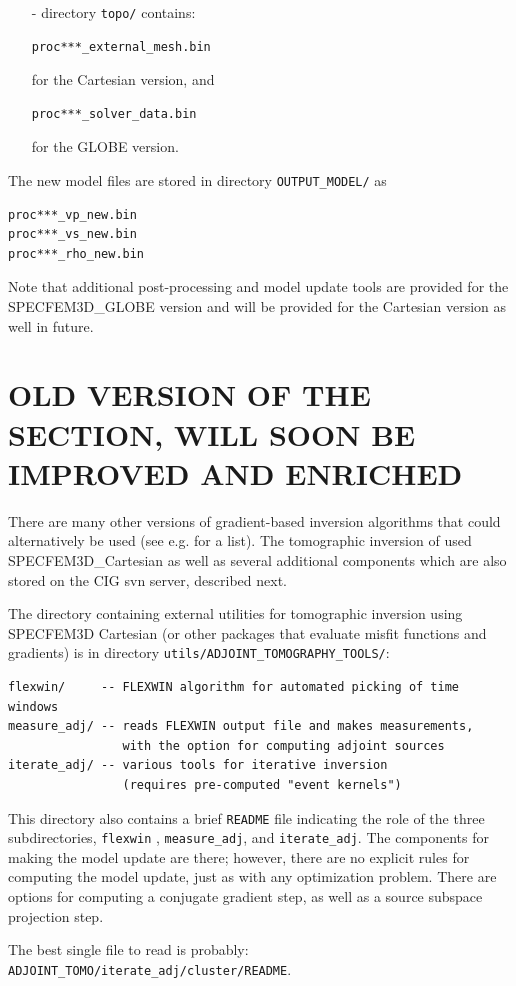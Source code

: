 \begin{description}
\begin{itemize}
\item [-] directory \texttt{topo/} contains:
\begin{verbatim}
proc***_external_mesh.bin
\end{verbatim}
for the Cartesian version, and
\begin{verbatim}
proc***_solver_data.bin
\end{verbatim}
for the GLOBE version.
\end{itemize}

\noindent
The new model files are stored in directory \texttt{OUTPUT\_MODEL/} as
\begin{verbatim}
proc***_vp_new.bin
proc***_vs_new.bin
proc***_rho_new.bin
\end{verbatim}

\end{description}

Note that additional post-processing and model update tools are provided for the SPECFEM3D\_GLOBE version and will be provided for the Cartesian version as well in future.


\section{OLD VERSION OF THE SECTION, WILL SOON BE IMPROVED AND ENRICHED}

There are many other versions of gradient-based inversion
algorithms that could alternatively be used (see e.g. \cite{ViOp09,MoChKoWa15} for a list).
The tomographic inversion of \citet{TaLiMaTr09,TaLiMaTr2010} used SPECFEM3D\_Cartesian as well
as several additional components which are also stored on the CIG
svn server, described next.\newline


The directory containing external utilities for tomographic inversion using
SPECFEM3D Cartesian (or other packages that evaluate misfit functions
and gradients) is in directory \texttt{utils/ADJOINT\_TOMOGRAPHY\_TOOLS/}:
\begin{verbatim}
flexwin/     -- FLEXWIN algorithm for automated picking of time windows
measure_adj/ -- reads FLEXWIN output file and makes measurements,
                with the option for computing adjoint sources
iterate_adj/ -- various tools for iterative inversion
                (requires pre-computed "event kernels")
\end{verbatim}
This directory also contains
a brief \verb+README+ file indicating the role of the three subdirectories,
\verb+flexwin+ \citep{Maggi2009}, \verb+measure_adj+, and \verb+iterate_adj+.
The components for making the model update are there; however, there
are no explicit rules for computing the model update, just as with
any optimization problem. There are options for computing a conjugate
gradient step, as well as a source subspace projection step.\newline


The best single file to read is probably: \verb+ADJOINT_TOMO/iterate_adj/cluster/README+.


